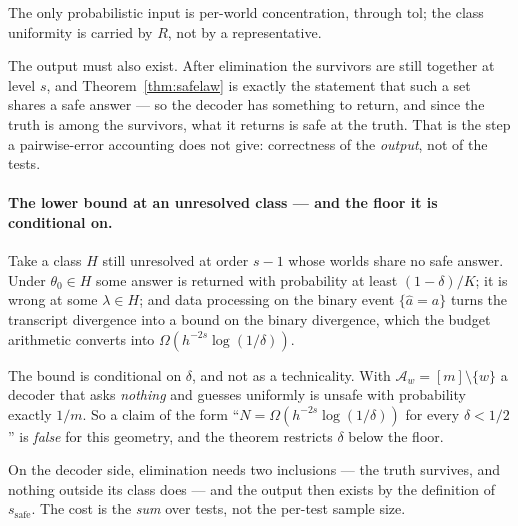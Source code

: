 The only probabilistic input is per-world concentration, through $\mathrm{tol}$; the class
uniformity is carried by $R$, not by a representative.

The output must also exist. After elimination the survivors are still together at level $s$,
and Theorem~\ref{thm:safelaw} is exactly the statement that such a set shares a safe answer
--- so the decoder has something to return, and since the truth is among the survivors, what
it returns is safe at the truth. That is the step a pairwise-error accounting does not give:
correctness of the \emph{output}, not of the tests.



\paragraph{The lower bound at an unresolved class --- and the floor it is conditional on.}
Take a class $H$ still unresolved at order $s-1$ whose worlds share no safe answer. Under
$\theta_{0}\in H$ some answer is returned with probability at least $(1-\delta)/K$; it is
wrong at some $\lambda\in H$; and data processing on the binary event
$\{\widehat a = a\}$ turns the transcript divergence into a bound on the binary divergence,
which the budget arithmetic converts into $\Omega(h^{-2s}\log(1/\delta))$.

The bound is conditional on $\delta$, and not as a technicality. With
$\mathcal A_{w}=[m]\setminus\{w\}$ a decoder that asks \emph{nothing} and guesses uniformly is
unsafe with probability exactly $1/m$. So a claim of the form ``$N=\Omega(h^{-2s}\log(1/\delta))$
for every $\delta<1/2$'' is \emph{false} for this geometry, and the theorem restricts $\delta$
below the floor.

On the decoder side, elimination needs two inclusions --- the truth survives, and nothing
outside its class does --- and the output then exists by the definition of
$s_{\mathrm{safe}}$. The cost is the \emph{sum} over tests, not the per-test sample size.

